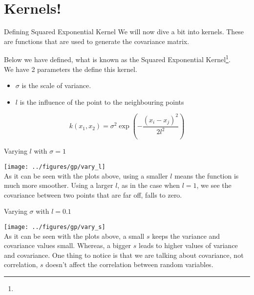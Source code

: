 \documentclass{beamer}
\begin{document}
	\section{Kernels!}
	\begin{frame}{Defining Squared Exponential Kernel}
		We will now dive a bit into kernels. These are functions that are used to generate the covariance matrix.
		
		Below we have defined, what is known as the Squared Exponential Kernel\footnote{\urlsek}. \\
		
		We have 2 parameters the define this kernel.
		\begin{itemize}
			\item $\sigma$ is the scale of variance.
			\item $l$ is the influence of the point to the neighbouring points
		\end{itemize}
		
		$$
		k(x_1, x_2) = \sigma^2 \exp\left(-\frac{(x_i - x_j)^2}{2l^2}\right)
		$$
	\end{frame}
	
	\begin{frame}{Varying $l$ with $\sigma = 1$}
		\begin{center}
			\texttt{[image: ../figures/gp/vary\_l]}\\
			As it can be seen with the plots above, using a smaller $l$ means the function is much more smoother. Using a larger $l$, as in the case when $l = 1$, we see the covariance between two points that are far off, falls to zero.
		\end{center}
		
	\end{frame}
	
	\begin{frame}{Varying $\sigma$ with $l = 0.1$}
		\begin{center}
			\texttt{[image: ../figures/gp/vary\_s]}\\
			As it can be seen with the plots above, a small $s$ keeps the variance and covariance values small. Whereas, a bigger $s$ leads to higher values of variance and covariance. One thing to notice is that we are talking about covariance, not correlation, $s$ doesn't affect the correlation between random variables.
		\end{center}
	\end{frame}
	
\end{document}
